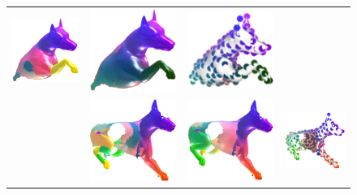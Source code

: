 \begin{figure}[b!]
\begin{tabular}[width=0.8\textwidth]{c|ccc}
		\includegraphics[scale=0.55]{figures/cuts_dog_8_PFM.png}  & \includegraphics[scale=0.53]{figures/cuts_dog_8.png} & \includegraphics[scale=0.48]{figures/cuts_dog_8_sparse.png}\\ & \includegraphics[scale=0.55]{figures/holes_dog_13_PFM.png} & \includegraphics[scale=0.53]{figures/holes_dog_13.png} &
		\includegraphics[scale=0.5]{figures/holes_dog_13_sparse.png}\\

\end{tabular}
\end{figure}
